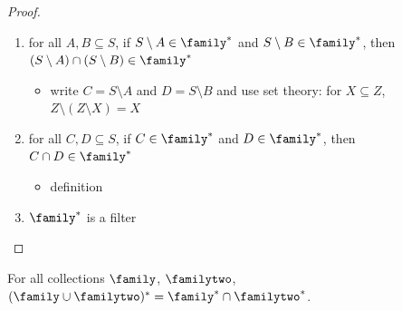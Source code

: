 \begin{proof}
\begin{enumerate}
        \item for all $A, B \subseteq S$, if $S \setminus A \in \family^*$ and $S \setminus B \in \family^*$, then $(S \setminus A) \cap (S \setminus B) \in \family^*$
        \begin{itemize}
            \item[--] write $C = S \setminus A$ and $D = S \setminus B$ and use set theory: for $X \subseteq Z$, $Z \setminus (Z \setminus X) = X$
        \end{itemize}

        \item for all $C, D \subseteq S$, if $C \in \family^*$ and $D \in \family^*$, then $C \cap D \in \family^*$
        \begin{itemize}
            \item[--] definition
        \end{itemize}

        \item $\family^*$ is a filter
    \end{enumerate}
\end{proof}



\begin{theorem}
    \label{thm_de_morgan_union_v1}
    \leanok{}
    For all collections $\family$, $\familytwo$, $(\family \cup \familytwo)^* = \family^* \cap \familytwo^*$.
\end{theorem}

